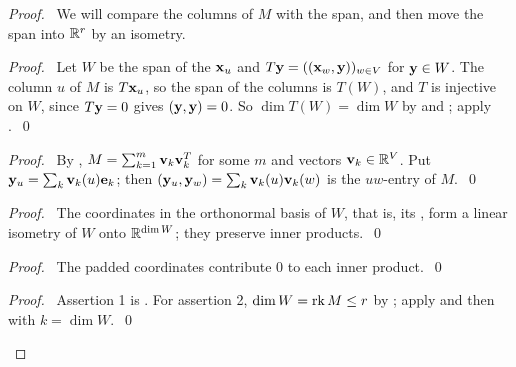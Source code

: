 \begin{proof}
 \pfsketch\ We will compare the columns of $M$ with the span, and then move the span into
 ${\mathbb R}^r$ by an isometry.
 \begin{proof}\pf\ Let $W$ be the span of the ${\mathbf x}_u$ and $T{\mathbf y}=(({\mathbf x}_w,{\mathbf y}))_{w\in V}$ for
  ${\mathbf y}\in W$. The column $u$ of $M$ is $T{\mathbf x}_u$, so the span of the columns is $T(W)$, and $T$
  is injective on $W$, since $T{\mathbf y}=0$ gives $({\mathbf y},{\mathbf y})=0$. So $\dim T(W)=\dim W$ by
   and ; apply
  .~\qed\end{proof}
 \begin{proof}\pf\ By ,
  $M=\sum_{k=1}^m{\mathbf v}_k{\mathbf v}_k^T$ for some $m$ and vectors ${\mathbf v}_k\in{\mathbb R}^V$. Put
  ${\mathbf y}_u=\sum_k{\mathbf v}_k(u){\mathbf e}_k$; then $({\mathbf y}_u,{\mathbf y}_w)=\sum_k{\mathbf v}_k(u){\mathbf v}_k(w)$ is the $uw$-entry of
  $M$.~\qed\end{proof}
 \begin{proof}\pf\ The coordinates in the orthonormal basis  of $W$,
  that is, its , form a linear isometry of $W$ onto
  ${\mathbb R}^{\dim W}$; they preserve inner products.~\qed\end{proof}
 \begin{proof}\pf\ The padded coordinates contribute $0$ to each inner
  product.~\qed\end{proof}
 \qedstep
 \begin{proof}\pf\ Assertion 1 is . For assertion 2, $\dim W=\mathop{\mathrm{rk}}\nolimits M\le r$ by
  ; apply  and then  with
  $k=\dim W$.~\qed\end{proof}
\end{proof}

